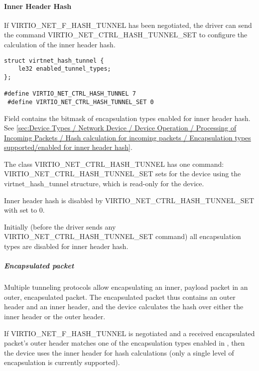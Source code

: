 \paragraph{Inner Header Hash}
\label{sec:Device Types / Network Device / Device Operation / Processing of Incoming Packets / Inner Header Hash}

If VIRTIO_NET_F_HASH_TUNNEL has been negotiated, the driver can send the command
VIRTIO_NET_CTRL_HASH_TUNNEL_SET to configure the calculation of the inner header hash.

\begin{lstlisting}
struct virtnet_hash_tunnel {
    le32 enabled_tunnel_types;
};

#define VIRTIO_NET_CTRL_HASH_TUNNEL 7
 #define VIRTIO_NET_CTRL_HASH_TUNNEL_SET 0
\end{lstlisting}

Field  contains the bitmask of encapsulation types enabled for inner header hash.
See \ref{sec:Device Types / Network Device / Device Operation / Processing of Incoming Packets /
Hash calculation for incoming packets / Encapsulation types supported/enabled for inner header hash}.

The class VIRTIO_NET_CTRL_HASH_TUNNEL has one command:
VIRTIO_NET_CTRL_HASH_TUNNEL_SET sets  for the device using the
virtnet_hash_tunnel structure, which is read-only for the device.

Inner header hash is disabled by VIRTIO_NET_CTRL_HASH_TUNNEL_SET with  set to 0.

Initially (before the driver sends any VIRTIO_NET_CTRL_HASH_TUNNEL_SET command) all
encapsulation types are disabled for inner header hash.

\subparagraph{Encapsulated packet}
\label{sec:Device Types / Network Device / Device Operation / Processing of Incoming Packets / Hash calculation for incoming packets / Encapsulated packet}

Multiple tunneling protocols allow encapsulating an inner, payload packet in an outer, encapsulated packet.
The encapsulated packet thus contains an outer header and an inner header, and the device calculates the
hash over either the inner header or the outer header.

If VIRTIO_NET_F_HASH_TUNNEL is negotiated and a received encapsulated packet's outer header matches one of the
encapsulation types enabled in , then the device uses the inner header for hash
calculations (only a single level of encapsulation is currently supported).

